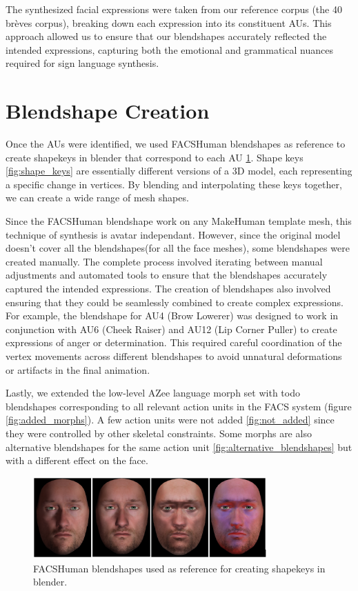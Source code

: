 \documentclass[../../main.tex]{subfiles}
\begin{document}
The synthesized facial expressions were taken from our reference corpus (the 40 brèves corpus), breaking down each expression into its constituent AUs. This approach allowed us to ensure that our blendshapes accurately reflected the intended expressions, capturing both the emotional and grammatical nuances required for sign language synthesis.

\section{Blendshape Creation}
\label{ch:facial_expressions:blendshape_creation}

Once the AUs were identified, we used FACSHuman \cite{fig:facshuman} blendshapes as reference to create shapekeys in blender that correspond to each AU \ref{fig:facshuman_blendshapes}. Shape keys \ref{fig:shape_keys} are essentially different versions of a 3D model, each representing a specific change in vertices. By blending and interpolating these keys together, we can create a wide range of mesh shapes.

Since the FACSHuman blendshape work on any MakeHuman template mesh, this technique of synthesis is avatar independant. However, since the original model doesn't cover all the blendshapes(for all the face meshes), some blendshapes were created manually. The complete process involved iterating between manual adjustments and automated tools to ensure that the blendshapes accurately captured the intended expressions. The creation of blendshapes also involved ensuring that they could be seamlessly combined to create complex expressions. For example, the blendshape for AU4 (Brow Lowerer) was designed to work in conjunction with AU6 (Cheek Raiser) and AU12 (Lip Corner Puller) to create expressions of anger or determination. This required careful coordination of the vertex movements across different blendshapes to avoid unnatural deformations or artifacts in the final animation.

Lastly, we extended the low-level AZee language morph set with todo blendshapes corresponding to all relevant action units in the FACS system (figure \ref{fig:added_morphs}). A few action units were not added \ref{fig:not_added} since they were controlled by other skeletal constraints. Some morphs are also alternative blendshapes for the same action unit \ref{fig:alternative_blendshapes} but with a different effect on the face.

\begin{figure}
    \centering
    \includegraphics[width=0.8\textwidth]{chapters/facial_expressions/images/facshuman_blendshapes.png}
    \caption{FACSHuman blendshapes used as reference for creating shapekeys in blender.}
    \label{fig:facshuman_blendshapes}
\end{figure}
\end{document}

